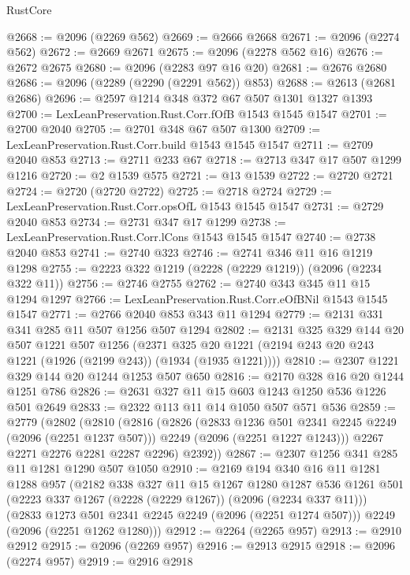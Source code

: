 \begin{lexlean}{RustCore}
\begin{coremodule}
@2668 := @2096 (@2269 @562)
@2669 := @2666 @2668
@2671 := @2096 (@2274 @562)
@2672 := @2669 @2671
@2675 := @2096 (@2278 @562 @16)
@2676 := @2672 @2675
@2680 := @2096 (@2283 @97 @16 @20)
@2681 := @2676 @2680
@2686 := @2096 (@2289 (@2290 (@2291 @562)) @853)
@2688 := @2613 (@2681 @2686)
@2696 := @2597 @1214 @348 @372 @67 @507 @1301 @1327 @1393
@2700 := LexLeanPreservation.Rust.Corr.fOfB @1543 @1545 @1547
@2701 := @2700 @2040
@2705 := @2701 @348 @67 @507 @1300
@2709 := LexLeanPreservation.Rust.Corr.build @1543 @1545 @1547
@2711 := @2709 @2040 @853
@2713 := @2711 @233 @67
@2718 := @2713 @347 @17 @507 @1299 @1216
@2720 := @2 @1539 @575
@2721 := @13 @1539
@2722 := @2720 @2721
@2724 := @2720 (@2720 @2722)
@2725 := @2718 @2724
@2729 := LexLeanPreservation.Rust.Corr.opsOfL @1543 @1545 @1547
@2731 := @2729 @2040 @853
@2734 := @2731 @347 @17 @1299
@2738 := LexLeanPreservation.Rust.Corr.lCons @1543 @1545 @1547
@2740 := @2738 @2040 @853
@2741 := @2740 @323
@2746 := @2741 @346 @11 @16 @1219 @1298
@2755 := @2223 @322 @1219 (@2228 (@2229 @1219)) (@2096 (@2234 @322 @11))
@2756 := @2746 @2755
@2762 := @2740 @343 @345 @11 @15 @1294 @1297
@2766 := LexLeanPreservation.Rust.Corr.eOfBNil @1543 @1545 @1547
@2771 := @2766 @2040 @853 @343 @11 @1294
@2779 := @2131 @331 @341 @285 @11 @507 @1256 @507 @1294
@2802 := @2131
    @325
    @329
    @144
    @20
    @507
    @1221
    @507
    @1256
    (@2371 @325 @20 @1221 (@2194 @243 @20 @243 @1221 (@1926 (@2199 @243)) (@1934 (@1935 @1221))))
@2810 := @2307 @1221 @329 @144 @20 @1244 @1253 @507 @650
@2816 := @2170 @328 @16 @20 @1244 @1251 @786
@2826 := @2631 @327 @11 @15 @603 @1243 @1250 @536 @1226 @501 @2649
@2833 := @2322 @113 @11 @14 @1050 @507 @571 @536
@2859 := @2779
    (@2802
      (@2810
        (@2816
          (@2826
            (@2833 @1236 @501 @2341 @2245 @2249 (@2096 (@2251 @1237 @507)))
            @2249
            (@2096 (@2251 @1227 @1243)))
          @2267
          @2271
          @2276
          @2281
          @2287
          @2296)
        @2392))
@2867 := @2307 @1256 @341 @285 @11 @1281 @1290 @507 @1050
@2910 := @2169
    @194
    @340
    @16
    @11
    @1281
    @1288
    @957
    (@2182
      @338
      @327
      @11
      @15
      @1267
      @1280
      @1287
      @536
      @1261
      @501
      (@2223 @337 @1267 (@2228 (@2229 @1267)) (@2096 (@2234 @337 @11)))
      (@2833 @1273 @501 @2341 @2245 @2249 (@2096 (@2251 @1274 @507)))
      @2249
      (@2096 (@2251 @1262 @1280)))
@2912 := @2264 (@2265 @957)
@2913 := @2910 @2912
@2915 := @2096 (@2269 @957)
@2916 := @2913 @2915
@2918 := @2096 (@2274 @957)
@2919 := @2916 @2918

\end{coremodule}
\end{lexlean}
